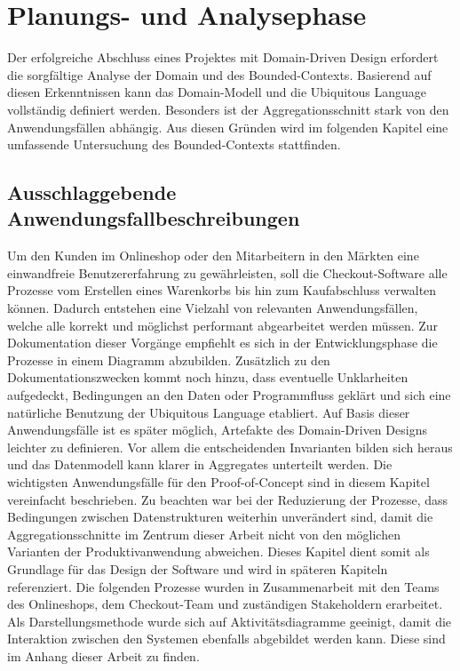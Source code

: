 

\chapter{Planungs- und Analysephase}

Der erfolgreiche Abschluss eines Projektes mit Domain-Driven Design erfordert die sorgfältige Analyse der Domain und des Bounded-Contexts. Basierend auf diesen Erkenntnissen kann das Domain-Modell und die Ubiquitous Language vollständig definiert werden. Besonders ist der Aggregationsschnitt stark von den Anwendungsfällen abhängig. Aus diesen Gründen wird im folgenden Kapitel eine umfassende Untersuchung des Bounded-Contexts stattfinden.

\section{Ausschlaggebende Anwendungsfallbeschreibungen}

Um den Kunden im Onlineshop oder den Mitarbeitern in den Märkten eine einwandfreie Benutzererfahrung zu gewährleisten, soll die Checkout-Software alle Prozesse vom Erstellen eines Warenkorbs bis hin zum Kaufabschluss verwalten können. Dadurch entstehen eine Vielzahl von relevanten Anwendungsfällen, welche alle korrekt und möglichst performant abgearbeitet werden müssen. Zur Dokumentation dieser Vorgänge empfiehlt es sich in der Entwicklungsphase die Prozesse in einem Diagramm abzubilden. Zusätzlich zu den Dokumentationszwecken kommt noch hinzu, dass eventuelle Unklarheiten aufgedeckt, Bedingungen an den Daten oder Programmfluss geklärt und sich eine natürliche Benutzung der Ubiquitous Language etabliert. Auf Basis dieser Anwendungsfälle ist es später möglich, Artefakte des Domain-Driven Designs leichter zu definieren. Vor allem die entscheidenden Invarianten bilden sich heraus und das Datenmodell kann klarer in Aggregates unterteilt werden. Die wichtigsten Anwendungsfälle für den Proof-of-Concept sind in diesem Kapitel vereinfacht beschrieben. Zu beachten war bei der Reduzierung der Prozesse, dass Bedingungen zwischen Datenstrukturen weiterhin unverändert sind, damit die Aggregationsschnitte im Zentrum dieser Arbeit nicht von den möglichen Varianten der Produktivanwendung abweichen. Dieses Kapitel dient somit als Grundlage für das Design der Software und wird in späteren Kapiteln referenziert. Die folgenden Prozesse wurden in Zusammenarbeit mit den Teams des Onlineshops, dem Checkout-Team und zuständigen \Gls{Stakeholder}n erarbeitet. Als Darstellungsmethode wurde sich auf Aktivitätsdiagramme geeinigt, damit die Interaktion zwischen den Systemen ebenfalls abgebildet werden kann. Diese sind im Anhang dieser Arbeit zu finden.

